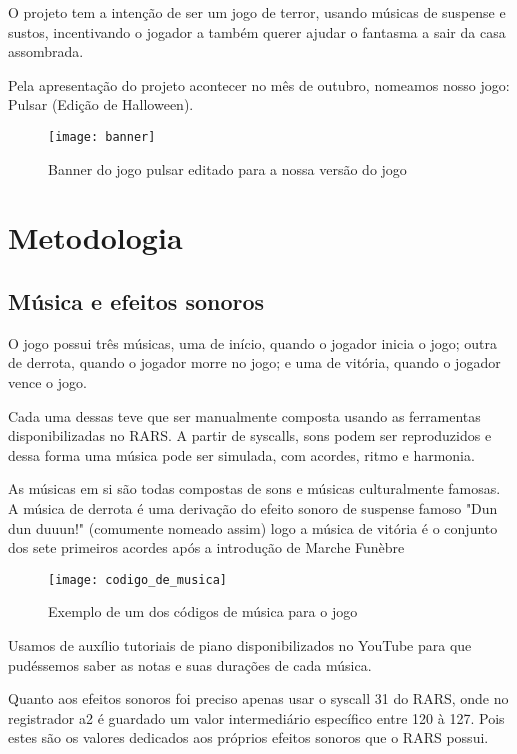 \documentclass[conference]{IEEEtran}
\begin{document}
O projeto tem a intenção de ser um jogo de terror, usando músicas de suspense e sustos, incentivando o jogador a também querer ajudar o fantasma a sair da casa assombrada.

Pela apresentação do projeto acontecer no mês de outubro, nomeamos nosso jogo: Pulsar (Edição de Halloween).


\begin{figure}[h]
\centering
\texttt{[image: banner]}
\caption{Banner do jogo pulsar editado para a nossa versão do jogo}
\end{figure}

\section{Metodologia}

\subsection{Música e efeitos sonoros}

O jogo possui três músicas, uma de início, quando o jogador inicia o jogo; outra de derrota, quando o jogador morre no jogo; e uma de vitória, quando o jogador vence o jogo.

Cada uma dessas teve que ser manualmente composta usando as ferramentas disponibilizadas no RARS. A partir de syscalls, sons podem ser reproduzidos e dessa forma uma música pode ser simulada, com acordes, ritmo e harmonia.

As músicas em si são todas compostas de sons e músicas culturalmente famosas. A música de derrota é uma derivação do efeito sonoro de suspense famoso "Dun dun duuun!" (comumente nomeado assim\textsuperscript{\cite{b3}})
logo a música de vitória é o conjunto dos sete primeiros acordes após a introdução de Marche Funèbre\textsuperscript{\cite{b4}}

\begin{figure}[h]
\centering
\texttt{[image: codigo\_de\_musica]}
\caption{Exemplo de um dos códigos de música para o jogo}
\end{figure}  

Usamos de auxílio tutoriais de piano disponibilizados no YouTube para que pudéssemos saber as notas e suas durações de cada música.

Quanto aos efeitos sonoros foi preciso apenas usar o syscall 31 do RARS, onde no registrador a2 é guardado um valor intermediário específico entre 120 à 127. Pois estes são os valores dedicados aos próprios efeitos sonoros que o RARS possui.
\end{document}
